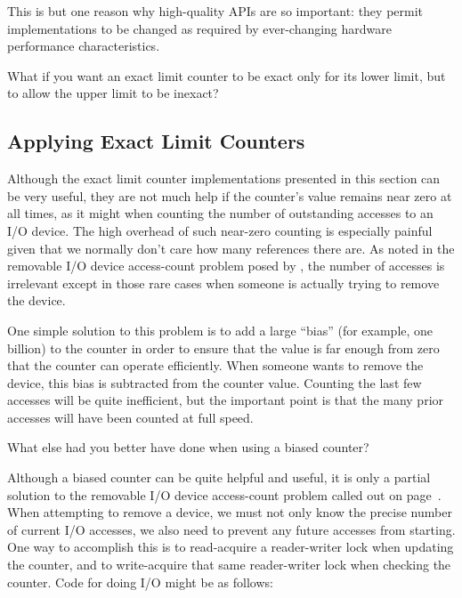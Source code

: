 This is but one reason why high-quality APIs are so important:
they permit implementations to be changed as required by ever-changing
hardware performance characteristics.

\QuickQuiz{}
	What if you want an exact limit counter to be exact only for
	its lower limit, but to allow the upper limit to be inexact?
 \QuickQuizEnd

\subsection{Applying Exact Limit Counters}
\label{sec:count:Applying Exact Limit Counters}

Although the exact limit counter implementations presented in this
section can be very useful, they are not much help if the counter's value
remains near zero at all times, as it might when counting the number
of outstanding accesses to an I/O device.
The high overhead of such near-zero counting is especially painful
given that we normally don't care how many references there are.
As noted in the removable I/O device access-count problem posed by
\QuickQuizRef{\QcountQIOcnt},
the number of accesses is irrelevant except in those rare cases when
someone is actually trying to remove the device.

One simple solution to this problem is to add a large ``bias''
(for example, one billion) to the
counter in order to ensure that the value is far enough from zero that
the counter can operate efficiently.
When someone wants to remove the device, this bias is subtracted from
the counter value.
Counting the last few accesses will be quite inefficient,
but the important point is that the many prior accesses will have been
counted at full speed.

\QuickQuiz{}
	What else had you better have done when using a biased counter?
 \QuickQuizEnd

Although a biased counter can be quite helpful and useful, it is only a
partial solution to the removable I/O device access-count problem
called out on
page~\pageref{chp:Counting}.
When attempting to remove a device, we must not only know the precise
number of current I/O accesses, we also need to prevent any future
accesses from starting.
One way to accomplish this is to read-acquire a reader-writer lock
when updating the counter, and to write-acquire that same reader-writer
lock when checking the counter.
Code for doing I/O might be as follows:

